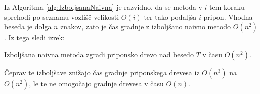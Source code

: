 
Iz Algoritma \ref{alg:IzboljsanaNaivna} je razvidno, da se metoda v $i$-tem koraku sprehodi po seznamu vozlišč velikosti $O(i)$ ter tako podaljša $i$ pripon. Vhodna beseda je dolga $n$ znakov, zato je čas gradnje z izboljšano naivno metodo $O(n^2)$. Iz tega sledi izrek:

\begin{izr}\label{izr:naivnaIzbolsana}
    Izboljšana naivna metoda zgradi priponsko drevo nad besedo $T$ v času $O(n^2)$.
\end{izr}

%

Čeprav te izboljšave znižajo čas gradnje priponskega drevesa iz $O(n^3)$ na $O(n^2)$, le te ne omogočajo gradnje drevesa v času $O(n)$.

